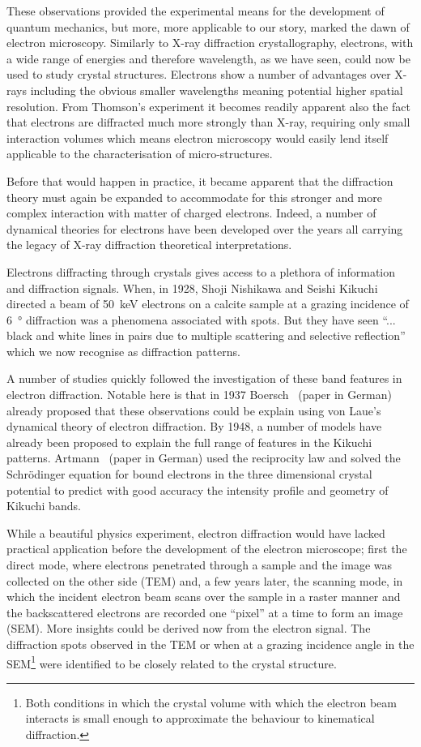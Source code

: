 These observations provided the experimental means for the development of quantum mechanics, but more, more applicable to our story, marked the dawn of electron microscopy. Similarly to X-ray diffraction crystallography, electrons, with a wide range of energies and therefore wavelength, as we have seen, could now be used to study crystal structures. Electrons show a number of advantages over X-rays including the obvious smaller wavelengths meaning potential higher spatial resolution. From Thomson's experiment it becomes readily apparent also the fact that electrons are diffracted much more strongly than X-ray, requiring only small interaction volumes which means electron microscopy would easily lend itself applicable to the characterisation of micro-structures. 


Before that would happen in practice, it became apparent that the diffraction theory must again be expanded to accommodate for this stronger and more complex interaction with matter of charged electrons. Indeed, a number of dynamical theories for electrons have been developed over the years all carrying the legacy of X-ray diffraction theoretical interpretations. 

Electrons diffracting through crystals gives access to a plethora of information and diffraction signals. When, in 1928, Shoji Nishikawa and Seishi Kikuchi directed a beam of \SI{50}{\kilo \electronvolt} electrons on a calcite sample at a grazing incidence of \SI{6}{\degree} diffraction was a phenomena associated with spots. But they have seen ``... black and white lines in pairs due to multiple scattering and selective reflection'' which we now recognise as diffraction patterns. 


A number of studies quickly followed the investigation of these band features in electron diffraction. Notable here is that in 1937 Boersch~\cite{Boersch37}   (paper in German) already proposed that these observations could be explain using von Laue's dynamical theory of electron diffraction. By 1948, a number of models have already been proposed to explain the full range of features in the Kikuchi patterns. Artmann~\cite{Artmann48} (paper in German) used the reciprocity law and solved the Schr{\"o}dinger equation for bound electrons in the three dimensional crystal potential to predict with good accuracy the intensity profile and geometry of Kikuchi bands. 

While a beautiful physics experiment, electron diffraction would have lacked practical application before the development of the electron microscope; first the direct mode, where electrons penetrated through a sample and the image was collected on the other side (TEM) and, a few years later, the scanning mode, in which the incident electron beam scans over the sample in a raster manner and the backscattered electrons are recorded one ``pixel'' at a time to form an image (SEM). More insights could be derived now from the electron signal. The diffraction spots observed in the TEM or when at a grazing incidence angle in the SEM\footnote{ Both conditions in which the crystal volume with which the electron beam interacts is small enough to approximate the behaviour to kinematical diffraction.} were identified to be closely related to the crystal structure. 



